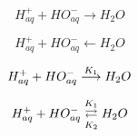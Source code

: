 
\Huge

\[H^+_{aq} + HO^-_{aq} \longrightarrow H_2O\]

\[H^+_{aq} + HO^-_{aq} \longleftarrow H_2O\]

\[H^+_{aq} + HO^-_{aq} \overset{\small K_1}{\longrightarrow} H_2O\]

\[H^+_{aq} + HO^-_{aq} \underset{\small K_2}{\overset{\small K_1}{\rightleftarrows}} H_2O\]

 
